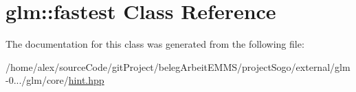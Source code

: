 \hypertarget{classglm_1_1fastest}{\section{glm\-:\-:fastest Class Reference}
\label{classglm_1_1fastest}
}


The documentation for this class was generated from the following file\-:\begin{DoxyCompactItemize}
\item 
/home/alex/source\-Code/git\-Project/beleg\-Arbeit\-E\-M\-M\-S/project\-Sogo/external/glm-\/0.../glm/core/\hyperlink{hint_8hpp}{hint.\-hpp}\end{DoxyCompactItemize}
